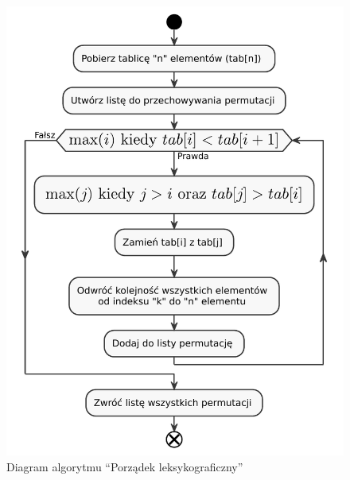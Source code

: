 \begin{figure}[H]
	\centering
	\includegraphics[]{chapters/chapter4/gen_perm.pdf}
	\caption{Diagram algorytmu ``Porządek leksykograficzny''}
	\label{gen_perm}
\end{figure}



